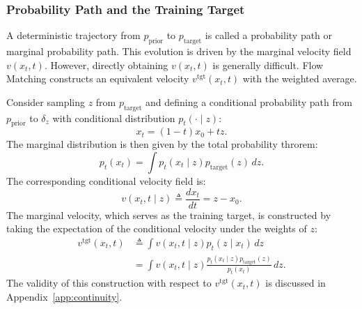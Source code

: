 \subsubsection{Probability Path and the Training Target}

A deterministic trajectory from $p_\text{prior}$ to $p_\text{target}$ is called a probability path or marginal probability path. This evolution is driven by the marginal velocity field $v(x_t, t)$. However, directly obtaining $v(x_t, t)$ is generally difficult. Flow Matching constructs an equivalent velocity $v^\text{tgt}(x_t, t)$ with the weighted average.

Consider sampling $z$ from $p_\text{target}$ and defining a conditional probability path from $p_\text{prior}$ to $\delta_z$ with conditional distribution $p_t(\cdot \mid z)$:
%
\begin{equation}
x_t = (1 - t) x_0 + t z.
\end{equation}
%
The marginal distribution is then given by the total probability throrem:
%
\begin{equation*}
p_t(x_t) = \int p_t(x_t \mid z) p_\text{target}(z) \, dz.
\end{equation*}
%
The corresponding conditional velocity field is:
%
\begin{equation}\label{ode_cond}
  v(x_t, t \mid z) \triangleq \frac{d x_t}{d t} = z - x_0.
\end{equation}
%
The marginal velocity, which serves as the training target, is constructed by taking the expectation of the conditional velocity under the weights of $z$:
%
\begin{align}
  v^\text{tgt}(x_t, t) &\triangleq \int v(x_t, t \mid z) p_t(z \mid x_t) \, d z \nonumber \\
  &= \int v(x_t, t \mid z) \frac{p_t(x_t \mid z) p_\text{target}(z)}{p_t(x_t)} \, dz.
\end{align}
%
The validity of this construction with respect to $v^\text{tgt} (x_t, t)$ is discussed in Appendix~\ref{app:continuity}.

